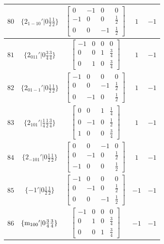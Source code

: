 \documentclass[fleqn,8pt]{jsarticle}
\begin{document}
\begin{longtable}{ccccc}
$ 80 $ & $ \{2{}_{1-10}{}'|0 \frac{1}{2} \frac{1}{2}\} $ & $ \begin{bmatrix} 0 & -1 & 0 & 0 \\ -1 & 0 & 0 & \frac{1}{2} \\ 0 & 0 & -1 & \frac{1}{2} \end{bmatrix} $ & $ 1 $ & $ -1 $ \\ \hline
$ 81 $ & $ \{2{}_{011}{}'|0 \frac{3}{4} \frac{3}{4}\} $ & $ \begin{bmatrix} -1 & 0 & 0 & 0 \\ 0 & 0 & 1 & \frac{3}{4} \\ 0 & 1 & 0 & \frac{3}{4} \end{bmatrix} $ & $ 1 $ & $ -1 $ \\ \hline
$ 82 $ & $ \{2{}_{01-1}{}'|0 \frac{1}{2} \frac{1}{2}\} $ & $ \begin{bmatrix} -1 & 0 & 0 & 0 \\ 0 & 0 & -1 & \frac{1}{2} \\ 0 & -1 & 0 & \frac{1}{2} \end{bmatrix} $ & $ 1 $ & $ -1 $ \\ \hline
$ 83 $ & $ \{2{}_{101}{}'|\frac{1}{4} \frac{1}{2} \frac{3}{4}\} $ & $ \begin{bmatrix} 0 & 0 & 1 & \frac{1}{4} \\ 0 & -1 & 0 & \frac{1}{2} \\ 1 & 0 & 0 & \frac{3}{4} \end{bmatrix} $ & $ 1 $ & $ -1 $ \\ \hline
$ 84 $ & $ \{2{}_{-101}{}'|0 \frac{1}{2} \frac{1}{2}\} $ & $ \begin{bmatrix} 0 & 0 & -1 & 0 \\ 0 & -1 & 0 & \frac{1}{2} \\ -1 & 0 & 0 & \frac{1}{2} \end{bmatrix} $ & $ 1 $ & $ -1 $ \\ \hline
$ 85 $ & $ \{-1{}'|0 \frac{1}{2} \frac{1}{2}\} $ & $ \begin{bmatrix} -1 & 0 & 0 & 0 \\ 0 & -1 & 0 & \frac{1}{2} \\ 0 & 0 & -1 & \frac{1}{2} \end{bmatrix} $ & $ -1 $ & $ -1 $ \\ \hline
$ 86 $ & $ \{{\rm m}_{100}{}'|0 \frac{3}{4} \frac{3}{4}\} $ & $ \begin{bmatrix} -1 & 0 & 0 & 0 \\ 0 & 1 & 0 & \frac{3}{4} \\ 0 & 0 & 1 & \frac{3}{4} \end{bmatrix} $ & $ -1 $ & $ -1 $ \\ \hline

\end{longtable}
\end{document}
